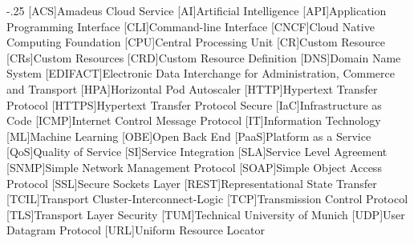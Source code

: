 \documentclass[headsepline,footsepline,footinclude=false,oneside,fontsize=11pt,paper=a4,listof=totoc,bibliography=totoc]{scrbook} %
\begin{document}


\frontmatter{}





\tableofcontents{}

\mainmatter{}

% 










\appendix{}


\begin{acronym}
	\itemsep-.25\baselineskip
	[ACS]{Amadeus Cloud Service}
	[AI]{Artificial Intelligence}
	[API]{Application Programming Interface}
	[CLI]{Command-line Interface}
	[CNCF]{Cloud Native Computing Foundation}
	[CPU]{Central Processing Unit}
	[CR]{Custom Resource}
	[CRs]{Custom Resources}
	[CRD]{Custom Resource Definition}
	[DNS]{Domain Name System}
	[EDIFACT]{Electronic Data Interchange for Administration, Commerce and Transport}
	[HPA]{Horizontal Pod Autoscaler}
	[HTTP]{Hypertext Transfer Protocol}
	[HTTPS]{Hypertext Transfer Protocol Secure}
	[IaC]{Infrastructure as Code}
	[ICMP]{Internet Control Message Protocol}
	[IT]{Information Technology}
	[ML]{Machine Learning}
	[OBE]{Open Back End}
	[PaaS]{Platform as a Service}
	[QoS]{Quality of Service}
	[SI]{Service Integration}
	[SLA]{Service Level Agreement}
	[SNMP]{Simple Network Management Protocol}
	[SOAP]{Simple Object Access Protocol}
	[SSL]{Secure Sockets Layer}
	[REST]{Representational State Transfer}
	[TCIL]{Transport Cluster-Interconnect-Logic}
	[TCP]{Transmission Control Protocol}
	[TLS]{Transport Layer Security}
	[TUM]{Technical University of Munich}
	[UDP]{User Datagram Protocol}
	[URL]{Uniform Resource Locator}
\end{acronym}

\listoffigures{}
\listoftables{}
\printbibliography{}
\end{document}
